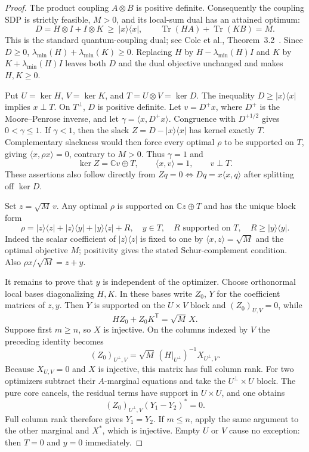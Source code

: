 \begin{proof}
The product coupling $A\otimes B$ is positive definite. Consequently the
coupling SDP is strictly feasible, $M>0$, and its local-sum dual has an
attained optimum:
\[
 D=H\otimes I+I\otimes K\ \ge\ |x\rangle\langle x|,
 \qquad \operatorname{Tr}(HA)+\operatorname{Tr}(KB)=M.
\]
This is the standard quantum-coupling dual; see Cole et al., Theorem~3.2~\cite{cole2023}. Since $D\ge0$,
$\lambda_{\min}(H)+\lambda_{\min}(K)\ge0$. Replacing
$H$ by $H-\lambda_{\min}(H)I$ and $K$ by
$K+\lambda_{\min}(H)I$ leaves both $D$ and the dual objective unchanged
and makes $H,K\ge0$.

Put $U=\ker H$, $V=\ker K$, and $T=U\otimes V=\ker D$.
The inequality $D\ge|x\rangle\langle x|$ implies $x\perp T$. On
$T^\perp$, $D$ is positive definite. Let $v=D^+x$, where $D^+$ is the
Moore--Penrose inverse, and let $\gamma=\langle x,D^+x\rangle$.
Congruence with $D^{+1/2}$ gives $0<\gamma\le1$. If $\gamma<1$, then
the slack $Z=D-|x\rangle\langle x|$ has kernel exactly $T$.
Complementary slackness would then force every optimal $\rho$ to be
supported on $T$, giving $\langle x,\rho x\rangle=0$, contrary to $M>0$.
Thus $\gamma=1$ and
\[
      \ker Z=\mathbb Cv\oplus T,\qquad
      \langle x,v\rangle=1,\qquad v\perp T.
\]
These assertions also follow directly from
$Zq=0\iff Dq=x\langle x,q\rangle$ after splitting off $\ker D$.

Set $z=\sqrt M\,v$. Any optimal $\rho$ is supported on
$\mathbb Cz\oplus T$ and has the unique block form
\[
 \rho=|z\rangle\langle z|+|z\rangle\langle y|
            +|y\rangle\langle z|+R,
 \quad y\in T,\quad R\text{ supported on }T,\quad R\ge|y\rangle\langle y|.
\]
Indeed the scalar coefficient of $|z\rangle\langle z|$ is fixed to one
by $\langle x,z\rangle=\sqrt M$ and the optimal objective $M$; positivity
gives the stated Schur-complement condition. Also
$\rho x/\sqrt M=z+y$.

It remains to prove that $y$ is independent of the optimizer. Choose
orthonormal local bases diagonalizing $H,K$. In these bases write $Z_0$,
$Y$ for the coefficient matrices of $z,y$. Then $Y$ is supported on the
$U\times V$ block and $(Z_0)_{U,V}=0$, while
\[
                   HZ_0+Z_0K^{\mathsf T}=\sqrt M\,X.
\]
Suppose first $m\ge n$, so $X$ is injective. On the columns indexed by
$V$ the preceding identity becomes
\[
   (Z_0)_{U^\perp,V}
      =\sqrt M\,(H|_{U^\perp})^{-1}X_{U^\perp,V}.
\]
Because $X_{U,V}=0$ and $X$ is injective, this matrix has full column
rank. For two optimizers subtract their $A$-marginal equations and take
the $U^\perp\times U$ block. The pure core cancels, the residual terms
have support in $U\times U$, and one obtains
\[
              (Z_0)_{U^\perp,V}(Y_1-Y_2)^*=0.
\]
Full column rank therefore gives $Y_1=Y_2$. If $m\le n$, apply the same
argument to the other marginal and $X^*$, which is injective. Empty
$U$ or $V$ cause no exception: then $T=0$ and $y=0$ immediately.


\end{proof}
